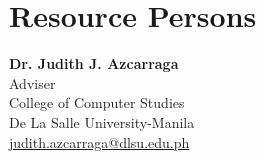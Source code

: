 %
%
%                 

\chapter{Resource Persons}
\label{sec:appendixc}

%
%
%
%

%
%
\newcommand{\resperson}[4]{\textbf{#1} \\ #2 \\ #3 \\ \url{#4}\vspace{0.5em}\\}

\textbf{Dr. Judith J. Azcarraga} \\ Adviser \\ College of Computer Studies\\De La Salle University-Manila \\ \url{judith.azcarraga@dlsu.edu.ph}\vspace{0.5em}\\

